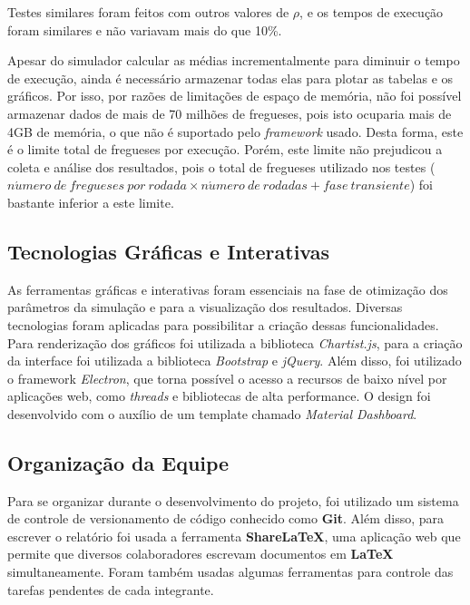 \documentclass[a4paper,12pt]{report}
\begin{document}
Testes similares foram feitos com outros valores de $\rho$, e os tempos de execução foram similares e não variavam mais do que 10\%. 

Apesar do simulador calcular as médias incrementalmente para diminuir o tempo de execução, ainda é necessário armazenar todas elas para plotar as tabelas e os gráficos. Por isso, por razões de limitações de espaço de memória, não foi possível armazenar dados de mais de 70 milhões de fregueses, pois isto ocuparia mais de 4GB de memória, o que não é suportado pelo \emph{framework} usado. Desta forma, este é o limite total de fregueses por execução. Porém, este limite não prejudicou a coleta e análise dos resultados, pois o total de fregueses utilizado nos testes ($n\acute{u}mero \ de \ fregueses \ por \ rodada \times n\acute{u}mero \ de \ rodadas + fase \ transiente$) foi bastante inferior a este limite.

\subsection{Tecnologias Gráficas e Interativas}

As ferramentas gráficas e interativas foram essenciais na fase de otimização dos parâmetros da simulação e para a visualização dos resultados. Diversas tecnologias foram aplicadas para possibilitar a criação dessas funcionalidades. Para renderização dos gráficos foi utilizada a biblioteca \emph{Chartist.js}, para a criação da interface foi utilizada a biblioteca \emph{Bootstrap} e \emph{jQuery}. Além disso, foi utilizado o framework \emph{Electron}, que torna possível o acesso a recursos de baixo nível por aplicações web, como \emph{threads} e bibliotecas de alta performance. O design foi desenvolvido com o auxílio de um template chamado \emph{Material Dashboard}.

\subsection{Organização da Equipe}

Para se organizar durante o desenvolvimento do projeto, foi utilizado um sistema de controle de versionamento de código conhecido como \textbf{Git}. Além disso, para escrever o relatório foi usada a ferramenta \textbf{ShareLaTeX}, uma aplicação web que permite que diversos colaboradores escrevam documentos em \textbf{LaTeX} simultaneamente. Foram também usadas algumas ferramentas para controle das tarefas pendentes de cada integrante.
\end{document}
